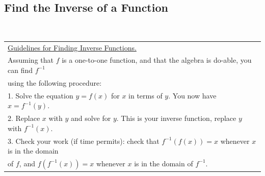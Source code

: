 \begin{enumerate}
\begin{enumerate}

\end{enumerate}


\newpage



\subsection{Find the Inverse of a Function} ~

\noindent \begin{tabular}{ | l  |} \hline
\noindent \underline{Guidelines for Finding Inverse Functions.} \\
Assuming that $f$ is a one-to-one function, and that the algebra is do-able, you can find $f^{-1}$ \\ using the following procedure: \\
1. Solve the equation $y=f(x)$ for $x$ in terms of $y$. You now have $x = f^{-1}(y)$. \\
2. Replace $x$ with $y$ and solve for $y$. This is your inverse function, replace $y$ with $f^{-1}(x)$. \\ 
3. Check your work (if time permits): check that $f^{-1}(f(x))=x$ whenever $x$ is in the domain\\ of $f$, and $f(f^{-1}(x))=x$ whenever $x$ is in the domain of $f^{-1}$. \\ \hline
\end{tabular} 



\end{enumerate}
